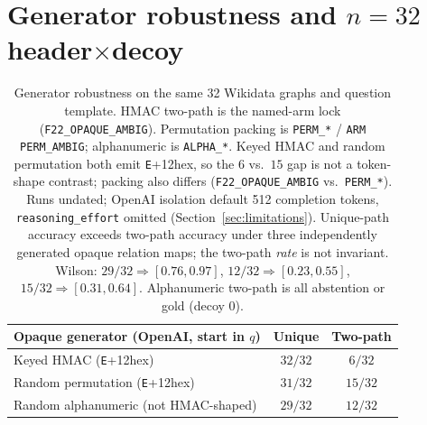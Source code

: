 \documentclass{article}
\begin{document}
\section{Generator robustness and $n{=}32$ header$\times$decoy}
\label{app:tokens}

\begin{table}[h]
\centering
\small
\begin{tabular}{@{}lcc@{}}
\toprule
Opaque generator (OpenAI, start in $q$) & Unique & Two-path \\
\midrule
Keyed HMAC (\texttt{E}+12hex) & $32/32$ & $6/32$ \\
Random permutation (\texttt{E}+12hex) & $31/32$ & $15/32$ \\
Random alphanumeric (not HMAC-shaped) & $29/32$ & $12/32$ \\
\bottomrule
\end{tabular}
\caption{Generator robustness on the same 32 Wikidata graphs and question
template. HMAC two-path is the named-arm lock
(\texttt{F22\_OPAQUE\_AMBIG}). Permutation packing is \texttt{PERM\_*} /
\texttt{ARM PERM\_AMBIG}; alphanumeric is \texttt{ALPHA\_*}.
Keyed HMAC and random permutation both emit \texttt{E}+12hex, so the $6$
vs.\ $15$ gap is not a token-shape contrast; packing also differs
(\texttt{F22\_OPAQUE\_AMBIG} vs.\ \texttt{PERM\_*}). Runs undated;
OpenAI isolation default 512 completion tokens,
\texttt{reasoning\_effort} omitted
(Section~\ref{sec:limitations}).
Unique-path accuracy exceeds two-path accuracy under three independently
generated opaque relation maps; the two-path \emph{rate} is not invariant.
Wilson: $29/32 \Rightarrow [0.76,0.97]$,
$12/32 \Rightarrow [0.23,0.55]$,
$15/32 \Rightarrow [0.31,0.64]$. Alphanumeric two-path is all abstention or
gold (decoy $0$).}
\label{tab:tokens}
\end{table}
\end{document}
